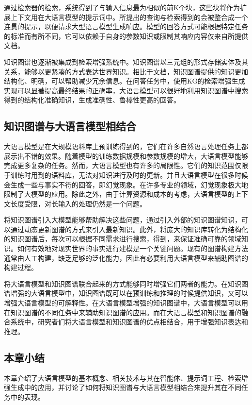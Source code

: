 通过检索器的检索，系统得到了与输入信息最为相似的前K个块，这些块将作为扩展上下文用在大语言模型的提示词中。所提出的查询与检索得到的会被整合成一个连贯的提示，以便请求大型语言模型生成响应。模型的回答方式可能根据特定任务的标准而有所不同，它可以依赖于自身的参数知识或限制其响应内容仅来自所提供文档。

知识图谱也逐渐被集成到检索增强系统中。知识图谱以三元组的形式存储实体及其关系，能够以更紧凑的方式表达世界知识。相比于文档，知识图谱提供的知识更加结构化、明确，可以帮助减少冗余信息。在问答任务中，使用KG的检索增强生成实现可以显著提高最终结果的正确率，大语言模型可以很好地利用知识图谱中搜索得到的结构化准确知识，生成准确性、鲁棒性更高的回答。

\subsection{知识图谱与大语言模型相结合}

大语言模型是在大规模语料库上预训练得到的，它们在许多自然语言处理任务上都展示出不错的效果。随着模型的训练数据规模和参数规模的增大，大语言模型能够完成更多复杂的任务。然而，大语言模型也有许多的局限性。它们的知识范围仅限于训练时用到的语料库\cite{50}，无法对知识进行及时的更新。并且大语言模型在很多时候会生成一些与事实不符的回答\cite{51}，即幻觉现象。在许多专业的领域，幻觉现象极大地限制了大模型的应用。除此之外，由于计算资源和成本的考虑，大语言模型的上下文长度受限，对长输入的处理仍然是一个问题。

将知识图谱引入大模型能够帮助解决这些问题，通过引入外部的知识图谱知识，可以通过动态更新图谱的方式来引入最新知识。此外，将庞大的知识库转化为结构化的知识图谱后，每次可以根据不同需求进行搜索，得到，来保证准确可靠的领域知识。如何有效地对现实世界的事实进行建模是一个关键问题。现有的图谱构建方法通常由人工构建，缺乏足够的泛化能力，因此有必要利用大语言模型来辅助图谱的构建过程。

将大语言模型和知识图谱联合起来的方式能够同时增强它们两者的能力。在知识图谱增强的大语言模型中，知识图谱既可以在预训练和推理的时候提供知识\cite{52}，又可以增强大语言模型的可解释性\cite{53}。在大语言模型增强的知识图谱中，大语言模型可以用在知识图谱的不同任务中来辅助知识图谱的应用。而在大语言模型和知识图谱的融合系统中，研究者们将大语言模型和知识图谱的优点相结合，用于增强知识表达\cite{54}和推理\cite{55}。

\subsection{本章小结}
本章介绍了大语言模型的基本概念、相关技术与其在智能体、提示词工程、检索增强生成中的应用，并讨论了如何将知识图谱与大语言模型相结合来提升其在不同任务中的表现。